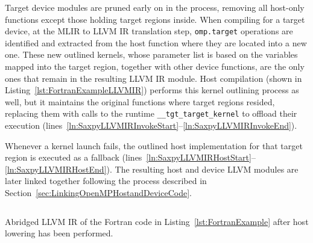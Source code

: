 \documentclass[acmtog,natbib=false]{acmart}
\newcommand{\code}[1]{\texttt{#1}\xspace}
\begin{document}
Target device modules are pruned early on in the process, removing all host-only functions except those holding target regions inside.
When compiling for a target device, at the \ac{MLIR} to LLVM \ac{IR} translation step, \code{omp.target} operations are identified and extracted from the host function where they are located into a new one.
These new outlined kernels, whose parameter list is based on the variables mapped into the target region, together with other device functions, are the only ones that remain in the resulting LLVM \ac{IR} module.
Host compilation (shown in Listing~\ref{lst:FortranExampleLLVMIR}) performs this kernel outlining process as well, but it maintains the original functions where target regions resided, replacing them with calls to the runtime \code{\_\_tgt\_target\_kernel} to offload their execution (lines~\ref{ln:SaxpyLLVMIRInvokeStart}--\ref{ln:SaxpyLLVMIRInvokeEnd}).

Whenever a kernel launch fails, the outlined host implementation for that target region is executed as a fallback (lines~\ref{ln:SaxpyLLVMIRHostStart}--\ref{ln:SaxpyLLVMIRHostEnd}).
The resulting host and device LLVM modules are later linked together following the process described in Section~\ref{sec:LinkingOpenMPHostandDeviceCode}.
 

\begin{listing}[t]
\inputminted{MLIR-lexer.py:MlirLexer -x}{code/tgt_loop_abridged.ll}
\caption{Abridged LLVM \ac{IR} of the Fortran code in Listing~\ref{lst:FortranExample} after host lowering has been performed.}
\label{lst:FortranExampleLLVMIR}
\end{listing}
\end{document}
